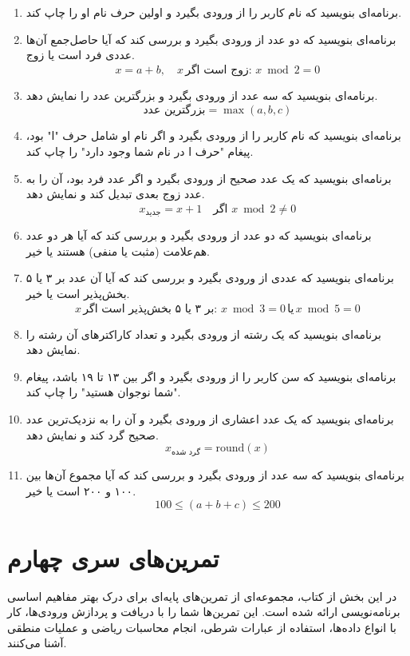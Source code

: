 \documentclass[b5paper,12pt]{article}
\begin{document}
\begin{enumerate}
		\item برنامه‌ای بنویسید که نام کاربر را از ورودی بگیرد و اولین حرف نام او را چاپ کند.
		
		\item برنامه‌ای بنویسید که دو عدد از ورودی بگیرد و بررسی کند که آیا حاصل‌جمع آن‌ها عددی فرد است یا زوج.
		\[
		x = a + b, \quad x \, \text{زوج است اگر: } x \bmod 2 = 0
		\]
		
		\item برنامه‌ای بنویسید که سه عدد از ورودی بگیرد و بزرگترین عدد را نمایش دهد.
		\[
		\text{بزرگترین عدد} = \max(a, b, c)
		\]
		
		\item برنامه‌ای بنویسید که نام کاربر را از ورودی بگیرد و اگر نام او شامل حرف "ا" بود، پیغام "حرف ا در نام شما وجود دارد" را چاپ کند.
		
		\item برنامه‌ای بنویسید که یک عدد صحیح از ورودی بگیرد و اگر عدد فرد بود، آن را به عدد زوج بعدی تبدیل کند و نمایش دهد.
		\[
		x_{\text{جدید}} = x + 1 \quad \text{اگر } x \bmod 2 \neq 0
		\]
		
		\item برنامه‌ای بنویسید که دو عدد از ورودی بگیرد و بررسی کند که آیا هر دو عدد هم‌علامت (مثبت یا منفی) هستند یا خیر.
		
		\item برنامه‌ای بنویسید که عددی از ورودی بگیرد و بررسی کند که آیا آن عدد بر ۳ یا ۵ بخش‌پذیر است یا خیر.
		\[
		x \, \text{بر ۳ یا ۵ بخش‌پذیر است اگر: } x \bmod 3 = 0 \, \text{یا} \, x \bmod 5 = 0
		\]
		
		\item برنامه‌ای بنویسید که یک رشته از ورودی بگیرد و تعداد کاراکترهای آن رشته را نمایش دهد.
		
		\item برنامه‌ای بنویسید که سن کاربر را از ورودی بگیرد و اگر بین ۱۳ تا ۱۹ باشد، پیغام "شما نوجوان هستید" را چاپ کند.
		
		\item برنامه‌ای بنویسید که یک عدد اعشاری از ورودی بگیرد و آن را به نزدیک‌ترین عدد صحیح گرد کند و نمایش دهد.
		\[
		x_{\text{گرد شده}} = \text{round}(x)
		\]
		
		\item برنامه‌ای بنویسید که سه عدد از ورودی بگیرد و بررسی کند که آیا مجموع آن‌ها بین ۱۰۰ و ۲۰۰ است یا خیر.
		\[
		100 \leq (a + b + c) \leq 200
		\]
		
	\end{enumerate}
	
	\newpage
	\section*{تمرین‌های سری چهارم}
	در این بخش از کتاب، مجموعه‌ای از تمرین‌های پایه‌ای برای درک بهتر مفاهیم اساسی برنامه‌نویسی ارائه شده است. این تمرین‌ها شما را با دریافت و پردازش ورودی‌ها، کار با انواع داده‌ها، استفاده از عبارات شرطی، انجام محاسبات ریاضی و عملیات منطقی آشنا می‌کنند.
\end{document}

